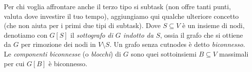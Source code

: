\vspace{0.5cm}

\vspace{0.5cm}


Per chi voglia affrontare anche il terzo tipo si subtask (non offre tanti punti, valuta dove investire il tuo tempo), aggiungiamo qui qualche ulteriore concetto (che non aiuta per i primi due tipi di subtask).
Dove $S\subseteq V$ è un insieme di nodi, denotiamo con $G[S]$ il \emph{sottografo di $G$ indotto da $S$}, ossia il grafo che si ottiene da $G$ per rimozione dei nodi in $V\setminus S$.   
Un grafo senza cutnodes è detto \emph{biconnesso}. Le \emph{componenti biconnesse} (o \emph{blocchi}) di $G$ sono quei sottoinsiemi $B\subseteq V$ massimali per cui $G[B]$ è biconnesso.

